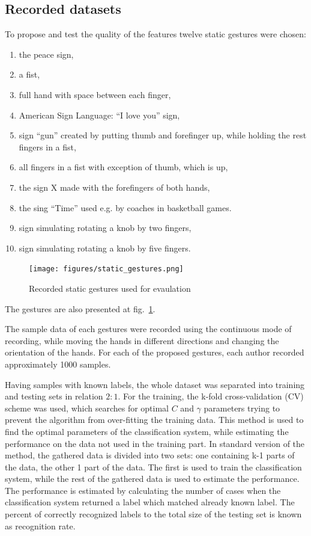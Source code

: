 \subsection{Recorded datasets}

To propose and test the quality of the features twelve static gestures were chosen:
\begin{enumerate}
\item the peace sign,
\item a fist,
\item full hand with space between each finger,
\item American Sign Language: ``I love you'' sign,
\item sign ``gun'' created by putting thumb and forefinger up, while holding the rest fingers in a fist,
\item all fingers in a fist with exception of thumb, which is up,
\item the sign X made with the forefingers of both hands,
\item the sing ``Time'' used e.g. by coaches in basketball games.
\item sign simulating rotating a knob by two fingers,
\item sign simulating rotating a knob by five fingers.
\end{enumerate} 

\begin{figure}[htb]
\centering
 \texttt{[image: figures/static\_gestures.png]}
 \caption{Recorded static gestures used for evaulation}
 \label{staticgesturesdata}
\end{figure}


The gestures are also presented at fig.~\ref{staticgesturesdata}.


The sample data of each gestures were recorded using the continuous mode of recording, while moving the hands in different directions and changing the orientation of the hands. 
For each of the proposed gestures, each author recorded approximately 1000 samples.

Having samples with known labels, the whole dataset was separated into training and testing sets in relation $2:1$. 
For the training, the k-fold cross-validation (CV) scheme was used, which searches for optimal $C$ and $\gamma$ parameters trying to prevent the algorithm from over-fitting the training data.
This method is used to find the optimal parameters of the classification system, while estimating the performance on the data not used in the training part. 
In standard version of the method, the gathered data is divided into two sets: one containing k-1 parts of the data, the other 1 part of the data. 
The first is used to train the classification system, while the rest of the gathered data is used to estimate the performance. 
The performance is estimated by calculating the number of cases when the classification system returned a label which matched already known label. 
The percent of correctly recognized labels to the total size of the testing set is known as recognition rate.



